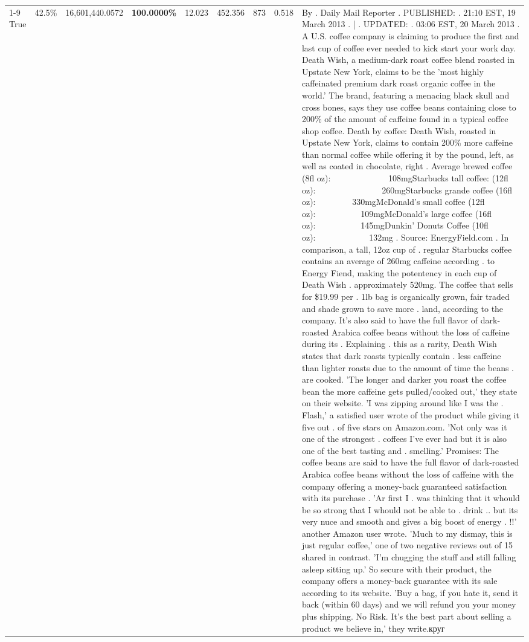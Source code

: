 \begin{table}[H]
{\begin{tabular}{lllrlllll}
\cline{1-9}
True & 42.5\% & 16,601,440.0572 & \bfseries \color{red} 100.0000\% & 12.023 & 452.356 & 873 & 0.518 & By . Daily Mail Reporter . PUBLISHED: . 21:10 EST, 19 March 2013 . | . UPDATED: . 03:06 EST, 20 March 2013 . A U.S. coffee company is claiming to produce the first and last cup of coffee ever needed to kick start your work day. Death Wish, a medium-dark roast coffee blend roasted in Upstate New York, claims to be the 'most highly caffeinated premium dark roast organic coffee in the world.' The brand, featuring a menacing black skull and cross bones, says they use coffee beans containing close to 200\% of the amount of caffeine found in a typical coffee shop coffee. Death by coffee: Death Wish, roasted in Upstate New York, claims to contain 200\% more caffeine than normal coffee while offering it by the pound, left, as well as coated in chocolate, right . Average brewed coffee (8fl oz):              108mgStarbucks tall coffee: (12fl oz):                260mgStarbucks grande coffee (16fl oz):         330mgMcDonald's small coffee (12fl oz):           109mgMcDonald's large coffee (16fl oz):           145mgDunkin' Donuts Coffee (10fl oz):             132mg . Source: EnergyField.com . In comparison, a tall, 12oz cup of . regular Starbucks coffee contains an average of 260mg caffeine according . to Energy Fiend, making the potentency in each cup of Death Wish . approximately 520mg. The coffee that sells for \$19.99 per . 1lb bag is organically grown, fair traded and shade grown to save more . land, according to the company. It's also said to have the full flavor of dark-roasted Arabica coffee beans without the loss of caffeine during its . Explaining . this as a rarity, Death Wish states that dark roasts typically contain . less caffeine than lighter roasts due to the amount of time the beans . are cooked. 'The longer and darker you roast the coffee bean the more caffeine gets pulled/cooked out,' they state on their website. 'I was zipping around like I was the . Flash,' a satisfied user wrote of the product while giving it five out . of five stars on Amazon.com. 'Not only was it one of the strongest . coffees I've ever had but it is also one of the best tasting and . smelling.’ Promises: The coffee beans are said to have the full flavor of dark-roasted Arabica coffee beans without the loss of caffeine with the company offering a money-back guaranteed satisfaction with its purchase . 'Ar first I . was thinking that it whould be so strong that I whould not be able to . drink .. but its very nuce and smooth and gives a big boost of energy . !!' another Amazon user wrote. 'Much to my dismay, this is just regular coffee,' one of two negative reviews out of 15 shared in contrast. 'I'm chugging the stuff and still falling asleep sitting up.' So secure with their product, the company offers a money-back guarantee with its sale according to its website. 'Buy a bag, if you hate it, send it back (within 60 days) and we will refund you your money plus shipping. No Risk. It’s the best part about selling a product we believe in,' they write.круг \\

\end{tabular}}
\end{table}
